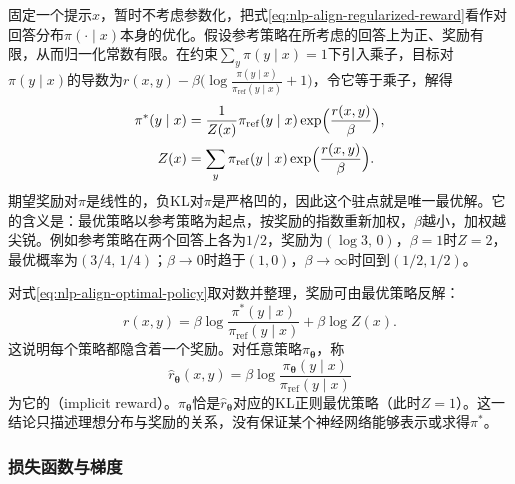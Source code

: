 固定一个提示$x$，暂时不考虑参数化，把式\eqref{eq:nlp-align-regularized-reward}看作对回答分布$\pi(\cdot\mid x)$本身的优化。假设参考策略在所考虑的回答上为正、奖励有限，从而归一化常数有限。在约束$\sum_y\pi(y\mid x)=1$下引入乘子，目标对$\pi(y\mid x)$的导数为$r(x,y)-\beta\bigl(\log\frac{\pi(y\mid x)}{\pi_{\mathrm{ref}}(y\mid x)}+1\bigr)$，令它等于乘子，解得
\begin{equation}
\label{eq:nlp-align-optimal-policy}
\begin{aligned}
 \pi^{*}(y\mid x)&=\frac{1}{Z(x)}\pi_{\mathrm{ref}}(y\mid x)\exp\Bigl(\frac{r(x,y)}{\beta}\Bigr),\\
 Z(x)&=\sum_y\pi_{\mathrm{ref}}(y\mid x)\exp\Bigl(\frac{r(x,y)}{\beta}\Bigr).
\end{aligned}
\end{equation}
期望奖励对$\pi$是线性的，负KL对$\pi$是严格凹的，因此这个驻点就是唯一最优解。它的含义是：最优策略以参考策略为起点，按奖励的指数重新加权，$\beta$越小，加权越尖锐。例如参考策略在两个回答上各为$1/2$，奖励为$(\log3,\,0)$，$\beta=1$时$Z=2$，最优概率为$(3/4,\,1/4)$；$\beta\to0$时趋于$(1,0)$，$\beta\to\infty$时回到$(1/2,1/2)$。

对式\eqref{eq:nlp-align-optimal-policy}取对数并整理，奖励可由最优策略反解：
\[
 r(x,y)=\beta\log\frac{\pi^{*}(y\mid x)}{\pi_{\mathrm{ref}}(y\mid x)}+\beta\log Z(x).
\]
这说明每个策略都隐含着一个奖励。对任意策略$\pi_{\bm\theta}$，称
\begin{equation}
\label{eq:nlp-align-implicit-reward}
 \hat r_{\bm\theta}(x,y)=\beta\log\frac{\pi_{\bm\theta}(y\mid x)}{\pi_{\mathrm{ref}}(y\mid x)}
\end{equation}
为它的（implicit reward）。$\pi_{\bm\theta}$恰是$\hat r_{\bm\theta}$对应的KL正则最优策略（此时$Z=1$）。这一结论只描述理想分布与奖励的关系，没有保证某个神经网络能够表示或求得$\pi^*$。

\subsubsection{损失函数与梯度}
\label{sec:nlp-align-dpo-gradient}

